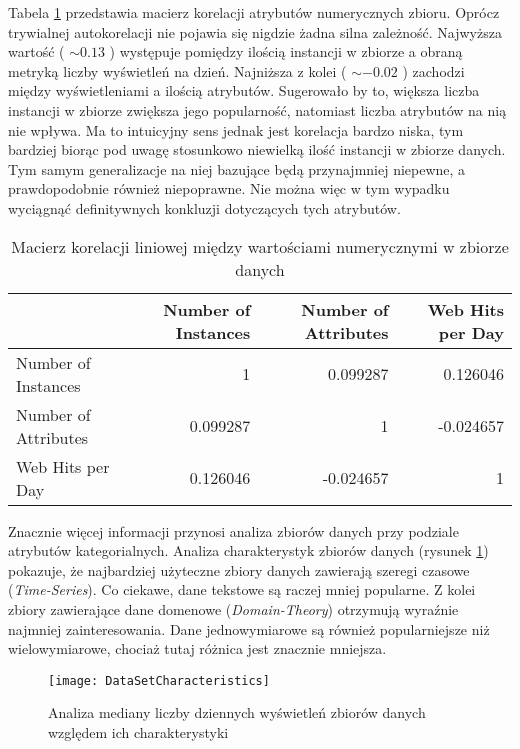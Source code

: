 Tabela \ref{tab:correlation} przedstawia macierz korelacji atrybutów numerycznych zbioru.
Oprócz trywialnej autokorelacji nie pojawia się nigdzie żadna silna zależność.
Najwyższa wartość ( \( \sim 0.13 \) ) występuje pomiędzy ilością instancji w zbiorze a obraną metryką liczby wyświetleń na dzień.
Najniższa z kolei ( \( \sim -0.02 \) ) zachodzi między wyświetleniami a ilością atrybutów.
Sugerowało by to, większa liczba instancji w zbiorze zwiększa jego popularność, natomiast liczba atrybutów na nią nie wpływa.
Ma to intuicyjny sens jednak jest korelacja bardzo niska, tym bardziej biorąc pod uwagę stosunkowo niewielką ilość instancji w zbiorze danych.
Tym samym generalizacje na niej bazujące będą przynajmniej niepewne, a prawdopodobnie również niepoprawne.
Nie można więc w tym wypadku wyciągnąć definitywnych konkluzji dotyczących tych atrybutów.

\begin{center}
  \begin{table}[ht]
    \begin{tabular}{|l|rrr|}
      \hline
                           & Number of Instances & Number of Attributes & Web Hits per Day \\
      \hline
      Number of Instances  & 1                   & 0.099287             & 0.126046         \\
      Number of Attributes & 0.099287            & 1                    & -0.024657        \\
      Web Hits per Day     & 0.126046            & -0.024657            & 1                \\
      \hline
    \end{tabular}
    \caption{Macierz korelacji liniowej między wartościami numerycznymi w zbiorze danych}
    \label{tab:correlation}
  \end{table}
\end{center}

Znacznie więcej informacji przynosi analiza zbiorów danych przy podziale atrybutów kategorialnych.
Analiza charakterystyk zbiorów danych (rysunek \ref{fig:datasetcharacteristics}) pokazuje, że najbardziej użyteczne zbiory danych zawierają szeregi czasowe (\emph{Time-Series}).
Co ciekawe, dane tekstowe są raczej mniej popularne.
Z kolei zbiory zawierające dane domenowe (\emph{Domain-Theory}) otrzymują wyraźnie najmniej zainteresowania.
Dane jednowymiarowe są również popularniejsze niż wielowymiarowe, chociaż tutaj różnica jest znacznie mniejsza.

\begin{figure}[ht]
  \texttt{[image: DataSetCharacteristics]}
  \caption{Analiza mediany liczby dziennych wyświetleń zbiorów danych względem ich charakterystyki}
  \label{fig:datasetcharacteristics}
\end{figure}

